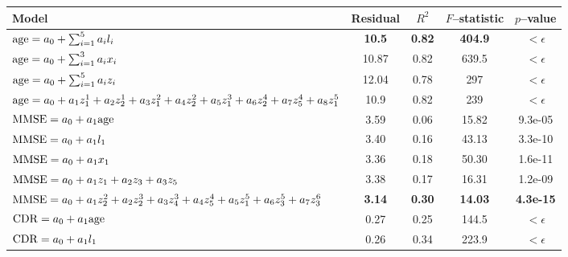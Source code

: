 \documentclass[twoside,11pt]{article}
\begin{document}
\begin{table}[tb]
\centering
\begin{footnotesize}
\begin{tabular}{l|c|c|c|c}
Model & 
Residual & $R^2$ &  $F$--statistic & $p$--value \\

\hline

${\rm age} =  a_0 + \sum_{i=1}^5 a_i l_i$ & 
{\bf 10.5} &  {\bf 0.82} & {\bf 404.9} & $ <\epsilon$ \\ 

${\rm age} =  a_0 + \sum_{i=1}^3 a_i x_i$  & 
10.87 &  0.82 & 639.5 & $ <\epsilon$ \\

${\rm age} =  a_0 + \sum_{i=1}^5 a_i z_i$  & 
12.04 &  0.78 & 297 & $ <\epsilon$ \\

${\rm age} = a_0 + a_1 z^1_1 + a_2 z^1_2 + a_3 z^2_1 + a_4 z^2_2 + a_5 z^3_1 +
a_6 z^4_2 + a_7 z^4_5 + a_8 z^5_1$  & 
10.9 & 0.82 & 239 & $<\epsilon$ \\


\hline

${\rm MMSE} = a_0 + a_1 {\rm age} $ & 
3.59 & 0.06 & 15.82 & 9.3e-05 \\

${\rm MMSE} = a_0 + a_1 l_1 $ & 
3.40 & 0.16 & 43.13 & 3.3e-10 \\

${\rm MMSE} = a_0 +a_1 x_1$ & 
3.36 & 0.18 &  50.30 & 1.6e-11 \\
 
${\rm MMSE} = a_0 + a_1 z_1 + a_2 z_3 + a_3 z_5$ & 
3.38 & 0.17 &  16.31 & 1.2e-09 \\

${\rm MMSE} = a_0 + a_1 z^2_2 + a_2 z^3_2 + a_3 z^3_4 + a_4 z^4_5 +
a_5 z^5_1 + a_6 z^5_3 + a_7 z^6_3$ & 
{\bf 3.14 } & {\bf 0.30 } & {\bf 14.03} & {\bf 4.3e-15 }\\

\hline

${\rm CDR} = a_0 + a_1 {\rm age} $ & 
0.27 & 0.25 & 144.5 & $ <\epsilon$ \\

${\rm CDR} = a_0 + a_1 l_1$ & 
0.26 & 0.34 & 223.9 & $ <\epsilon$ \\ 


\end{tabular}
\end{footnotesize}
\end{table}
\end{document}
